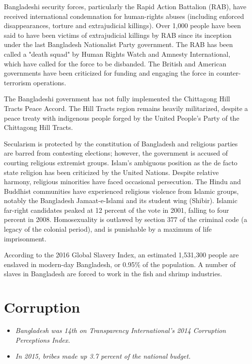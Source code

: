 Bangladeshi security forces, particularly the Rapid Action Battalion
(RAB), have received international condemnation for human-rights abuses
(including enforced disappearances, torture and extrajudicial killings).
Over 1,000 people have been said to have been victims of extrajudicial
killings by RAB since its inception under the last Bangladesh
Nationalist Party government. The RAB has been called a "death squad" by
Human Rights Watch and Amnesty International, which have called for the
force to be disbanded. The British and American governments have been
criticized for funding and engaging the force in counter-terrorism
operations.

The Bangladeshi government has not fully implemented the Chittagong Hill
Tracts Peace Accord. The Hill Tracts region remains heavily militarized,
despite a peace treaty with indigenous people forged by the United
People's Party of the Chittagong Hill Tracts.

Secularism is protected by the constitution of Bangladesh and religious
parties are barred from contesting elections; however, the government is
accused of courting religious extremist groups. Islam's ambiguous
position as the de facto state religion has been criticized by the
United Nations. Despite relative harmony, religious minorities have
faced occasional persecution. The Hindu and Buddhist communities have
experienced religious violence from Islamic groups, notably the
Bangladesh Jamaat-e-Islami and its student wing (Shibir). Islamic
far-right candidates peaked at 12 percent of the vote in 2001, falling
to four percent in 2008. Homosexuality is outlawed by section 377 of the
criminal code (a legacy of the colonial period), and is punishable by a
maximum of life imprisonment.

According to the 2016 Global Slavery Index, an estimated 1,531,300
people are enslaved in modern-day Bangladesh, or 0.95\% of the
population. A number of slaves in Bangladesh are forced to work in the
fish and shrimp industries.

\section{Corruption}\label{corruption}

\begin{itemize}
\item
  \emph{Bangladesh was 14th on Transparency International's 2014
  Corruption Perceptions Index.}
\item
  \emph{In 2015, bribes made up 3.7 percent of the national budget.}
\end{itemize}

